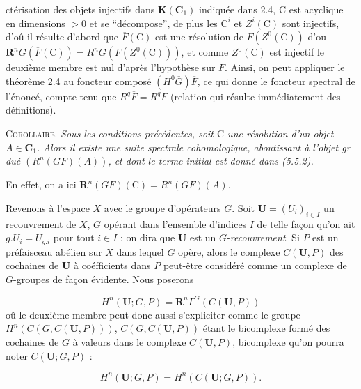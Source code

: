\clearpage
{}

\noindent ctérisation des objets injectifs dans $\mathbf K({\mathbf C}_1)$ indiquée dans
2.4, $\mathrm C$ est acyclique en dimensions $>0$ et se ``décompose'', de plus les
$\mathrm C^i$ et $Z^i(\mathrm C)$ sont injectifs, d'oû il résulte d'abord que $\overline F(\mathrm C)$
est une résolution de $F(Z^0(\mathrm C))$ d'ou
${\mathbf R}^nG(\overline F(\mathrm C))=R^nG(F(Z^0(\mathrm C)))$, et comme $Z^0(\mathrm C)$ est injectif le
deuxième membre est nul d'après l'hypothèse sur $F$. Ainsi, on peut appliquer
le théorème 2.4 au foncteur composé $(H^0\overline G)\overline F$, ce qui donne
le foncteur spectral de l'énoncé, compte tenu que
$R^q\overline F=\overline{R^qF}$ (relation qui résulte immédiatement des
définitions).

\textsc{Corollaire.} \textit{Sous les conditions précédentes, soit $\mathrm C$
une résolution d'un objet $A\in {\mathbf C}_1$. Alors il existe une suite spectrale
cohomologique, aboutissant à l'objet gr dué $(R^n(GF)(A))$, et dont le terme
initial est donné dans \textup{(5.5.2)}.}

En effet, on a ici ${\mathbf R}^n(GF)(\mathrm C)=R^n(GF)(A)$.

Revenons à l'espace $X$ avec le groupe d'opérateurs $G$. Soit
${\mathbf U}=(U_i)_{i\in I}$ un recouvrement de $X$, $G$ opérant dans l'ensemble
d'indices $I$ de telle façon qu'on ait $g. U_i=U_{g. i}$ pour tout
$i\in I$ : on dira que ${\mathbf U}$ est un $G$-\textit{recouvrement}. Si $P$ est un
préfaisceau abélien sur $X$ dans lequel $G$ opère, alors le complexe
$C({\mathbf U},P)$ des cochaines de ${\mathbf U}$ à coéfficients dans $P$ peut-être considéré comme un complexe de $G$-groupes de façon évidente. Nous
poserons

\[
\tag{5.5.3}
H^n({\mathbf U};G,P)={\mathbf R}^n\Gamma^G(C({\mathbf U},P))
\]
oû le deuxième membre peut donc aussi s'expliciter comme le groupe
$H^n(C(G,C({\mathbf U},P)))$, $C(G,C({\mathbf U},P))$ étant le bicomplexe formé
des cochaines de $G$ à valeurs dans le complexe $C({\mathbf U},P)$, bicomplexe
qu'on pourra noter $C({\mathbf U};G,P)$ :

\[
\tag{5.5.3 bis}
H^n({\mathbf U};G,P)=H^n(C({\mathbf U};G,P)).
\]

